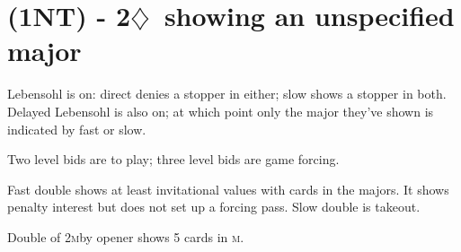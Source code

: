\documentclass{article}
\renewcommand{\d}{\ensuremath{\diamondsuit}}
\newcommand{\+}{\ensuremath{^+}}
\newcommand{\M}{\textsc{m}}
\begin{document}
\section{(1NT) - 2\d\ showing an unspecified major}
Lebensohl is on: direct denies a stopper in either; slow shows a stopper in both.  Delayed Lebensohl is also on; at which point only the major they've shown is indicated by fast or slow.

Two level bids are to play; three level bids are game forcing.

Fast double shows at least invitational values with cards in the majors.  It shows penalty interest but does not set up a forcing pass.  Slow double is takeout.

Double of 2\M by opener shows 5 cards in \M.
\end{document}

